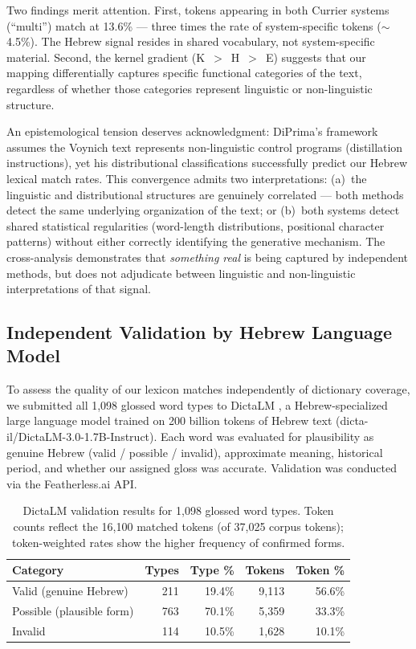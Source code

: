 \documentclass[11pt,a4paper]{article}
\begin{document}
Two findings merit attention. First, tokens appearing in both Currier
systems (``multi'') match at 13.6\% --- three times the rate of
system-specific tokens ($\sim$4.5\%). The Hebrew signal resides in
shared vocabulary, not system-specific material. Second, the kernel
gradient (K~$>$~H~$>$~E) suggests that our mapping differentially captures
specific functional categories of the text, regardless of whether those
categories represent linguistic or non-linguistic structure.

An epistemological tension deserves acknowledgment: DiPrima's framework
assumes the Voynich text represents non-linguistic control programs
(distillation instructions), yet his distributional classifications
successfully predict our Hebrew lexical match rates. This convergence
admits two interpretations: (a)~the linguistic and distributional structures
are genuinely correlated --- both methods detect the same underlying
organization of the text; or (b)~both systems detect shared statistical
regularities (word-length distributions, positional character patterns)
without either correctly identifying the generative mechanism. The
cross-analysis demonstrates that \emph{something real} is being captured
by independent methods, but does not adjudicate between linguistic and
non-linguistic interpretations of that signal.


\subsection{Independent Validation by Hebrew Language Model}
\label{sec:dictalm}

To assess the quality of our lexicon matches independently of dictionary
coverage, we submitted all 1,098 glossed word types to DictaLM
\citep{DictaLM2024}, a Hebrew-specialized large language model trained on
200 billion tokens of Hebrew text (dicta-il/DictaLM-3.0-1.7B-Instruct).
Each word was evaluated for plausibility as genuine Hebrew (valid /
possible / invalid), approximate meaning, historical period, and
whether our assigned gloss was accurate. Validation was conducted via the
Featherless.ai API.

\begin{table}[htbp]
\centering
\caption{DictaLM validation results for 1,098 glossed word types.
Token counts reflect the 16,100 matched tokens (of 37,025 corpus tokens);
token-weighted rates show the higher frequency of confirmed forms.}
\label{tab:dictalm}
\small
\begin{tabular}{@{}lrrrr@{}}
\toprule
Category & Types & Type \% & Tokens & Token \% \\
\midrule
Valid (genuine Hebrew) & 211 & 19.4\% & 9,113 & 56.6\% \\
Possible (plausible form) & 763 & 70.1\% & 5,359 & 33.3\% \\
Invalid & 114 & 10.5\% & 1,628 & 10.1\% \\
\bottomrule
\end{tabular}
\end{table}
\end{document}
